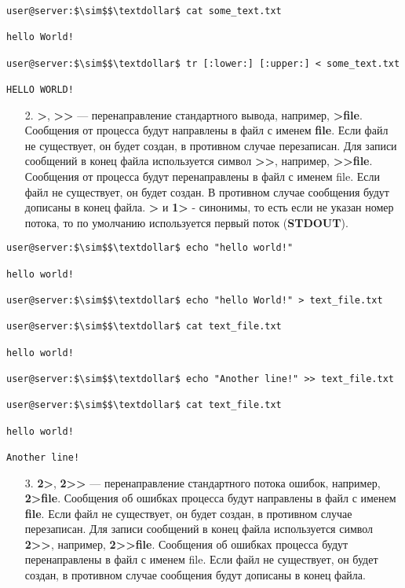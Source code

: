 \documentclass[14pt, a4paper]{article}
\begin{document}
\begin{lstlisting}
user@server:$\sim$$\textdollar$ cat some_text.txt
            
hello World!
            
user@server:$\sim$$\textdollar$ tr [:lower:] [:upper:] < some_text.txt
            
HELLO WORLD!
\end{lstlisting}

\begin{enumerate}
    \item[2.] \textbf{>}, \textbf{>}\textbf{>} — перенаправление стандартного вывода, например, \textbf{>file}. Сообщения от процесса
    будут направлены в файл с именем \textbf{file}. Если файл не существует, он будет создан, в
    противном случае перезаписан. Для записи сообщений в конец файла используется символ
    \textbf{>}\textbf{>}, например, \textbf{>}\textbf{>}\textbf{file}. Сообщения от процесса будут перенаправлены в файл с именем file.
    Если файл не существует, он будет создан. В противном случае сообщения будут дописаны в
    конец файла. \textbf{>} и \textbf{1>} - синонимы, то есть если не указан номер потока, то по умолчанию
    используется первый поток (\textbf{STDOUT}).
\end{enumerate}

\begin{lstlisting}
user@server:$\sim$$\textdollar$ echo "hello world!"

hello world!

user@server:$\sim$$\textdollar$ echo "hello World!" > text_file.txt

user@server:$\sim$$\textdollar$ cat text_file.txt

hello world!

user@server:$\sim$$\textdollar$ echo "Another line!" >> text_file.txt

user@server:$\sim$$\textdollar$ cat text_file.txt

hello world!

Another line!
\end{lstlisting}

\begin{enumerate}
    \item[3.] \textbf{2>}, \textbf{2>}\textbf{>} — перенаправление стандартного потока ошибок, например, \textbf{2>file}. Сообщения об
    ошибках процесса будут направлены в файл с именем \textbf{file}. Если файл не существует, он будет
    создан, в противном случае перезаписан. Для записи сообщений в конец файла используется
    символ \textbf{2>}\textbf{>}, например, \textbf{2>}\textbf{>}\textbf{file}. Сообщения об ошибках процесса будут перенаправлены в
    файл с именем file. Если файл не существует, он будет создан, в противном случае сообщения
    будут дописаны в конец файла.
\end{enumerate}
\end{document}
